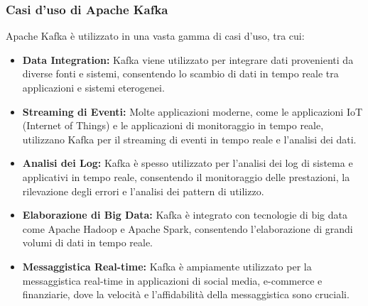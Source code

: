 \subsubsection{Casi d'uso di Apache Kafka}

Apache Kafka è utilizzato in una vasta gamma di casi d'uso, tra cui:

\begin{itemize}
  \item \textbf{Data Integration:} Kafka viene utilizzato per integrare dati provenienti da diverse fonti e sistemi, consentendo lo scambio di dati in tempo reale tra applicazioni e sistemi eterogenei.
  
  \item \textbf{Streaming di Eventi:} Molte applicazioni moderne, come le applicazioni IoT (Internet of Things) e le applicazioni di monitoraggio in tempo reale, utilizzano Kafka per il streaming di eventi in tempo reale e l'analisi dei dati.
  
  \item \textbf{Analisi dei Log:} Kafka è spesso utilizzato per l'analisi dei log di sistema e applicativi in tempo reale, consentendo il monitoraggio delle prestazioni, la rilevazione degli errori e l'analisi dei pattern di utilizzo.
  
  \item \textbf{Elaborazione di Big Data:} Kafka è integrato con tecnologie di big data come Apache Hadoop e Apache Spark, consentendo l'elaborazione di grandi volumi di dati in tempo reale.
  
  \item \textbf{Messaggistica Real-time:} Kafka è ampiamente utilizzato per la messaggistica real-time in applicazioni di social media, e-commerce e finanziarie, dove la velocità e l'affidabilità della messaggistica sono cruciali.
\end{itemize}